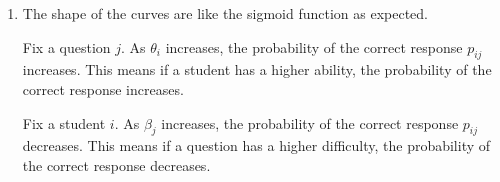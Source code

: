 \documentclass{article}
\begin{document}
\begin{enumerate}[label=(\alph*)]
    \item The shape of the curves are like the sigmoid function as expected.
    
    Fix a question $j$. As $\theta_i$ increases, the probability of the correct response $p_{ij}$ increases. This means if a student has a higher ability, the probability of the correct response increases.

    Fix a student $i$. As $\beta_j$ increases, the probability of the correct response $p_{ij}$ decreases. This means if a question has a higher difficulty, the probability of the correct response decreases.
\end{enumerate}
\end{document}
